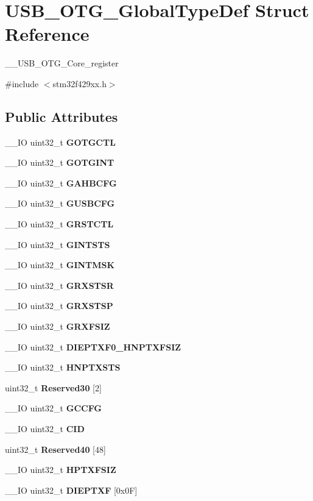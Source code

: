 \section{U\+S\+B\+\_\+\+O\+T\+G\+\_\+\+Global\+Type\+Def Struct Reference}
\label{structUSB__OTG__GlobalTypeDef}


\+\_\+\+\_\+\+U\+S\+B\+\_\+\+O\+T\+G\+\_\+\+Core\+\_\+register  




{\ttfamily \#include $<$stm32f429xx.\+h$>$}

\subsection*{Public Attributes}
\begin{DoxyCompactItemize}
\item 
\+\_\+\+\_\+\+IO uint32\+\_\+t \textbf{ G\+O\+T\+G\+C\+TL}
\item 
\+\_\+\+\_\+\+IO uint32\+\_\+t \textbf{ G\+O\+T\+G\+I\+NT}
\item 
\+\_\+\+\_\+\+IO uint32\+\_\+t \textbf{ G\+A\+H\+B\+C\+FG}
\item 
\+\_\+\+\_\+\+IO uint32\+\_\+t \textbf{ G\+U\+S\+B\+C\+FG}
\item 
\+\_\+\+\_\+\+IO uint32\+\_\+t \textbf{ G\+R\+S\+T\+C\+TL}
\item 
\+\_\+\+\_\+\+IO uint32\+\_\+t \textbf{ G\+I\+N\+T\+S\+TS}
\item 
\+\_\+\+\_\+\+IO uint32\+\_\+t \textbf{ G\+I\+N\+T\+M\+SK}
\item 
\+\_\+\+\_\+\+IO uint32\+\_\+t \textbf{ G\+R\+X\+S\+T\+SR}
\item 
\+\_\+\+\_\+\+IO uint32\+\_\+t \textbf{ G\+R\+X\+S\+T\+SP}
\item 
\+\_\+\+\_\+\+IO uint32\+\_\+t \textbf{ G\+R\+X\+F\+S\+IZ}
\item 
\+\_\+\+\_\+\+IO uint32\+\_\+t \textbf{ D\+I\+E\+P\+T\+X\+F0\+\_\+\+H\+N\+P\+T\+X\+F\+S\+IZ}
\item 
\+\_\+\+\_\+\+IO uint32\+\_\+t \textbf{ H\+N\+P\+T\+X\+S\+TS}
\item 
uint32\+\_\+t \textbf{ Reserved30} [2]
\item 
\+\_\+\+\_\+\+IO uint32\+\_\+t \textbf{ G\+C\+C\+FG}
\item 
\+\_\+\+\_\+\+IO uint32\+\_\+t \textbf{ C\+ID}
\item 
uint32\+\_\+t \textbf{ Reserved40} [48]
\item 
\+\_\+\+\_\+\+IO uint32\+\_\+t \textbf{ H\+P\+T\+X\+F\+S\+IZ}
\item 
\+\_\+\+\_\+\+IO uint32\+\_\+t \textbf{ D\+I\+E\+P\+T\+XF} [0x0\+F]
\end{DoxyCompactItemize}


